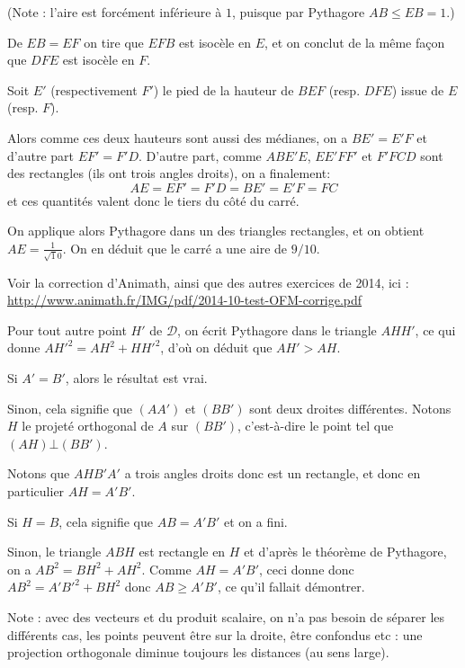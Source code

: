 \begin{Soln}{72}
(Note : l'aire est forcément inférieure à $1$, puisque par Pythagore $AB\leq EB=1$.)

De $EB=EF$ on tire que $EFB$ est isocèle en $E$, et on conclut de la même façon que $DFE$ est isocèle en $F$.

Soit $E'$ (respectivement $F'$) le pied de la hauteur de $BEF$ (resp. $DFE$) issue de $E$ (resp. $F$).

Alors comme ces deux hauteurs sont aussi des médianes, on a $BE'=E'F$ et d'autre part $EF'=F'D$.
D'autre part, comme $ABE'E$, $EE'FF'$ et $F'FCD$ sont des rectangles (ils ont trois angles droits), on a finalement:
\[ AE=EF'=F'D  =  BE'=E'F=FC \]
et ces quantités  valent donc le tiers du côté du carré.

On applique alors Pythagore dans un des triangles rectangles, et on obtient $AE=\frac{1}{\sqrt 10}$. On en déduit que le carré a une aire de $9/10$.

Voir la correction d'Animath, ainsi que des autres exercices de 2014, ici : \url{http://www.animath.fr/IMG/pdf/2014-10-test-OFM-corrige.pdf}


\end{Soln}
\begin{Soln}{73}
Pour tout autre point $H'$ de $\mathcal D$, on écrit Pythagore dans le triangle $AHH'$, ce qui donne $AH'^2=AH^2+HH'^2$, d'où on déduit que $AH' > AH$.
\end{Soln}
\begin{Soln}{74}
Si $A'=B'$, alors le résultat est vrai.

Sinon, cela signifie que $(AA')$ et $(BB')$ sont deux droites différentes. Notons $H$ le projeté orthogonal de $A$ sur $(BB')$, c'est-à-dire le point tel que $(AH)\bot (BB')$.

Notons que $AHB'A'$ a trois angles droits donc est un rectangle, et donc en particulier $AH=A'B'$.

Si $H=B$, cela signifie que $AB=A'B'$ et on a fini.

Sinon, le triangle $ABH$ est rectangle en $H$ et d'après le théorème de Pythagore, on a $AB^2=BH^2+AH^2$. Comme $AH=A'B'$, ceci donne donc $AB^2=A'B'^2+BH^2$ donc $AB\geq A'B'$, ce qu'il fallait démontrer.

Note : avec des vecteurs et du produit scalaire, on n'a pas besoin de séparer les différents cas, les points peuvent être sur la droite, être confondus etc : une projection orthogonale diminue toujours les distances (au sens large).
\end{Soln}
